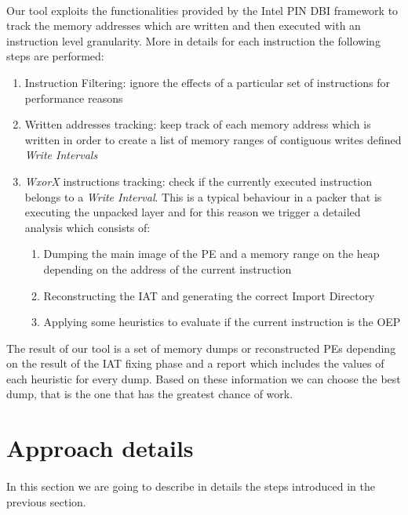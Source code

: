 \paragraph{}
Our tool exploits the functionalities provided by the Intel PIN \ac{DBI} framework to track the memory addresses which are written and then executed with an instruction level granularity.
More in details for each instruction the following steps are performed:
\begin{enumerate}
\item Instruction Filtering: ignore the effects of a particular set of instructions for performance reasons
\item Written addresses tracking: keep track of each memory address which is written in order to create a list of memory ranges of contiguous writes defined \textit{Write Intervals} 
\item \textit{\ac{WxorX}} instructions tracking: check if the currently executed instruction belongs to a \textit{Write Interval}. This is a typical behaviour in a packer that is executing the unpacked layer and for this reason we trigger a detailed analysis which consists of:
	\begin{enumerate}
	\item Dumping the main image of the \ac{PE} and a memory range on the heap depending on the address of the current instruction
	\item Reconstructing the \ac{IAT} and generating the correct Import Directory
	\item Applying some heuristics to evaluate if the current instruction is the \ac{OEP}
	\end{enumerate}
\end{enumerate}
The result of our tool is a set of memory dumps or reconstructed \acp{PE} depending on the result of the \ac{IAT} fixing phase and a report which includes the values of each heuristic for every dump. Based on these information we can choose the best dump, that is the one that has the greatest chance of work.

\section{Approach details}
\paragraph{}
In this section we are going to describe in details the steps introduced in the previous section.

